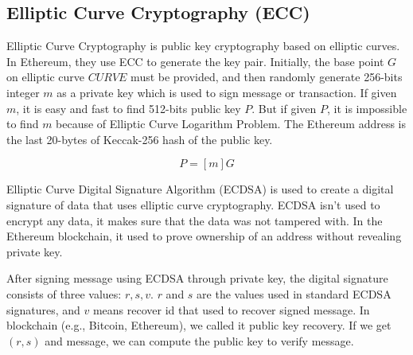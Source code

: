     \subsection{Elliptic Curve Cryptography (ECC)}
        Elliptic Curve Cryptography is public key cryptography based on elliptic curves. In Ethereum, they use ECC to generate the key pair. Initially, the base point \(G\) on elliptic curve \(CURVE\) must be provided, and then randomly generate 256-bits integer \(m\) as a private key which is used to sign message or transaction. If given \(m\), it is easy and fast to find 512-bits public key \(P\). But if given \(P\), it is impossible to find \(m\) because of Elliptic Curve Logarithm Problem. The Ethereum address is the last 20-bytes of  Keccak-256 hash of the public key.\par

        \begin{equation}
            P=[m]G
        \end{equation}

        Elliptic Curve Digital Signature Algorithm (ECDSA) is used to create a digital signature of data that uses elliptic curve cryptography. ECDSA isn't used to encrypt any data, it makes sure that the data was not tampered with. In the Ethereum blockchain, it used to prove ownership of an address without revealing private key. \par
        After signing message using ECDSA through private key, the digital signature consists of three values: \(r, s, v\). \(r\) and \(s\) are the values used in standard ECDSA signatures, and \(v\) means recover id that used to recover signed message. In blockchain (e.g., Bitcoin, Ethereum), we called it public key recovery. If we get \((r, s)\) and message, we can compute the public key to verify message.\par
    
    \newpage
